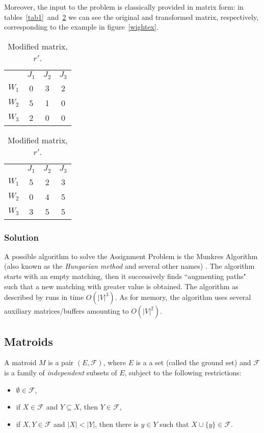 \documentclass[a4,11pt]{article}
\begin{document}
Moreover, the input to the problem is classically provided in matrix form: in tables~\ref{tab1}~and~\ref{tab2} we can see the original and transformed matrix, respectively, corresponding to the example in figure~\ref{wightex}.

\begin{table}[ht]
    \parbox{.45\linewidth}{
        \centering
        \begin{tabular}{cccc}
                  & $J_1$ & $J_2$ & $J_3$ \\
            $W_1$ & 0     & 3     & 2     \\
            $W_2$ & 5     & 1     & 0     \\
            $W_3$ & 2     & 0     & 0     \\
        \end{tabular}
        \caption{Original matrix, $r$.} \label{tab1}
    }
    \hfill
    \parbox{.45\linewidth}{
        \centering
        \begin{tabular}{cccc}
                  & $J_1$ & $J_2$ & $J_3$ \\
            $W_1$ & 5     & 2     & 3     \\
            $W_2$ & 0     & 4     & 5     \\
            $W_3$ & 3     & 5     & 5     \\
        \end{tabular}
        \caption{Modified matrix, $r'$.} \label{tab2}
    }
\end{table}

\subsubsection{Solution} \label{munkres}
A possible algorithm to solve the Assignment Problem is the Munkres Algorithm (also known as the \textit{Hungarian method} and several other names) \cite{schrijver_combinatorial_2013}. The algorithm starts with an empty matching, then it successively finds ``augmenting paths" such that a new matching with greater value is obtained. The algorithm as described by \textcite{jin_kue_wong_new_1979} runs in time $O(\left|V\right|^3)$. As for memory, the algorithm uses several auxiliary matrices/buffers amounting to $O(\left|V\right|^2)$.

\subsection{Matroids}
A matroid $M$ is a pair $(E, \mathcal{F})$, where $E$ is a a set (called the ground set) and $\mathcal{F}$ is a family of \textit{independent} subsets of $E$, subject to the following restrictions:
\begin{itemize}
    \setlength\itemsep{-.1em}
    \item $ \emptyset \in \mathcal{F} $,
    \item if $X \in \mathcal{F}$ and $Y \subseteq X$, then $Y \in \mathcal{F}$,
    \item if $X, Y \in \mathcal{F}$ and $|X| < |Y|$, then there is $y \in Y$ such that $X \cup \{y\} \in \mathcal{F}$.
\end{itemize}
\end{document}
